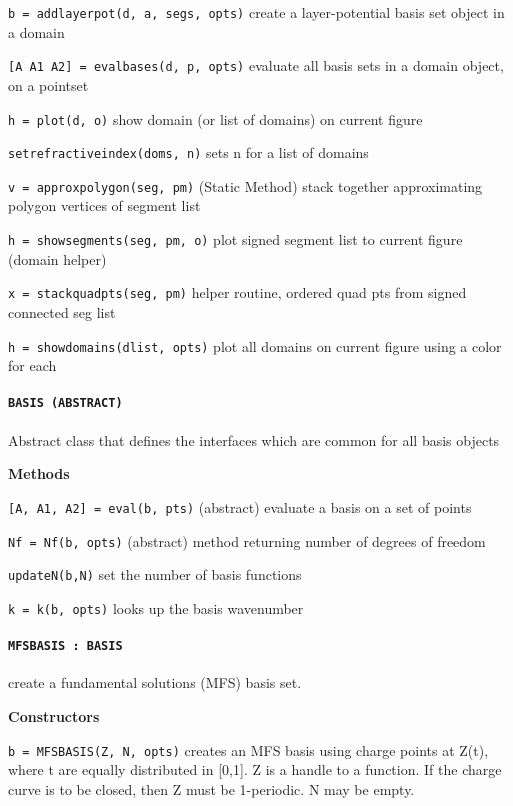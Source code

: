 {\tt b = addlayerpot(d, a, segs, opts)} create a layer-potential
basis set object in a domain

{\tt [A A1 A2] = evalbases(d, p, opts)} evaluate all basis sets in
a domain object, on a pointset

{\tt h = plot(d, o)} show domain (or list of domains) on current figure

{\tt setrefractiveindex(doms, n)} sets n for a list of domains

{\tt v = approxpolygon(seg, pm)} (Static Method) stack together
approximating polygon vertices of segment list

{\tt h = showsegments(seg, pm, o)} plot signed segment list to
current figure (domain helper)

{\tt x = stackquadpts(seg, pm)} helper routine, ordered quad pts
from signed connected seg list 

{\tt h = showdomains(dlist, opts)} plot all domains on current
figure using a color for each

\newpage

\paragraph{\tt BASIS (ABSTRACT)} Abstract class that defines the
interfaces which are common for all basis objects


\textbf{Methods}

{\tt [A, A1, A2] = eval(b, pts)} (abstract) evaluate a basis on a set of points

{\tt Nf = Nf(b, opts)} (abstract) method returning number of degrees of freedom

{\tt updateN(b,N)} set the number of basis functions

{\tt k = k(b, opts)} looks up the basis wavenumber





\newpage 

\paragraph{\tt MFSBASIS : BASIS} create a fundamental solutions (MFS) basis
set.

\textbf{Constructors}

{\tt b = MFSBASIS(Z, N, opts)} creates an MFS basis using charge points
    at Z(t), where t are equally distributed in [0,1]. Z is a handle
   to a function. If the charge curve is to be closed, then Z must be
   1-periodic. N may be empty.

